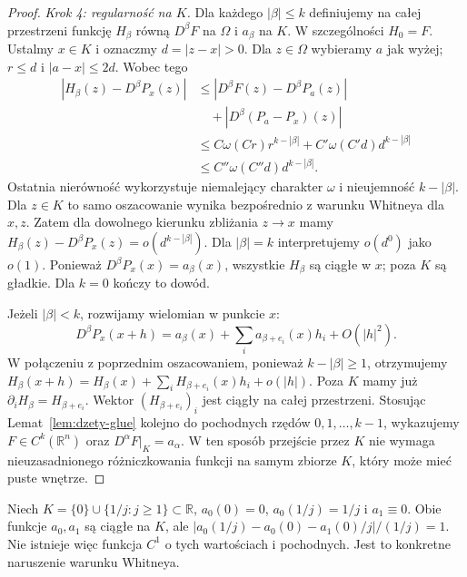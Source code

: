 \begin{proof}
\emph{Krok 4: regularność na $K$.}
Dla każdego $|\beta|\le k$ definiujemy na całej
przestrzeni funkcję $H_\beta$ równą $D^\beta F$
na $\Omega$ i $a_\beta$ na $K$. W szczególności
$H_0=F$. Ustalmy $x\in K$ i oznaczmy $d=|z-x|>0$.
Dla $z\in\Omega$ wybieramy $a$ jak wyżej;
$r\le d$ i $|a-x|\le2d$. Wobec tego
\[
 \begin{split}
 |H_\beta(z)-D^\beta P_x(z)|
 &\le |D^\beta F(z)-D^\beta P_a(z)|\\
 &\quad+|D^\beta(P_a-P_x)(z)|\\
 &\le C\omega(Cr)r^{k-|\beta|}
       +C'\omega(C'd)d^{k-|\beta|}\\
 &\le C''\omega(C''d)d^{k-|\beta|}.
 \end{split}
\]
Ostatnia nierówność wykorzystuje niemalejący
charakter $\omega$ i nieujemność $k-|\beta|$.
Dla $z\in K$ to samo oszacowanie wynika
bezpośrednio z warunku Whitneya dla $x,z$.
Zatem dla dowolnego kierunku zbliżania $z\to x$
mamy $H_\beta(z)-D^\beta P_x(z)=o(d^{k-|\beta|})$.
Dla $|\beta|=k$ interpretujemy $o(d^0)$ jako $o(1)$.
Ponieważ $D^\beta P_x(x)=a_\beta(x)$,
wszystkie $H_\beta$ są ciągłe w $x$; poza $K$
są gładkie. Dla $k=0$ kończy to dowód.

Jeżeli $|\beta|<k$, rozwijamy wielomian w punkcie $x$:
\[
 D^\beta P_x(x+h)
 =a_\beta(x)+\sum_i a_{\beta+e_i}(x)h_i+O(|h|^2).
\]
W połączeniu z poprzednim oszacowaniem, ponieważ
$k-|\beta|\ge1$, otrzymujemy
$H_\beta(x+h)=H_\beta(x)+\sum_i H_{\beta+e_i}(x)h_i+o(|h|)$.
Poza $K$ mamy już $\partial_i H_\beta=H_{\beta+e_i}$.
Wektor $(H_{\beta+e_i})_i$ jest ciągły na całej przestrzeni. Stosując
Lemat~\ref{lem:dzety-glue} kolejno do pochodnych
rzędów $0,1,\ldots,k-1$, wykazujemy
$F\in C^k(\mathbb R^n)$ oraz $D^\alpha F|_K=a_\alpha$.
W ten sposób przejście przez $K$ nie wymaga
nieuzasadnionego różniczkowania funkcji na samym zbiorze
$K$, który może mieć puste wnętrze.
\end{proof}

\begin{przyklad}
Niech $K=\{0\}\cup\{1/j:j\ge1\}\subset\mathbb R$,
$a_0(0)=0$, $a_0(1/j)=1/j$ i $a_1\equiv0$.
Obie funkcje $a_0,a_1$ są ciągłe na $K$, ale
$|a_0(1/j)-a_0(0)-a_1(0)/j|/(1/j)=1$.
Nie istnieje więc funkcja $C^1$ o tych wartościach i
pochodnych. Jest to konkretne naruszenie warunku Whitneya.
\end{przyklad}

